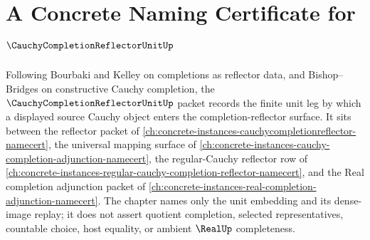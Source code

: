 \chapter{A Concrete Naming Certificate for $\CauchyCompletionReflectorUnitUp$}
\label{ch:concrete-instances-cauchy-completion-reflector-unit-namecert}

Following Bourbaki and Kelley on completions as reflector data, and Bishop--Bridges on constructive Cauchy completion, the $\CauchyCompletionReflectorUnitUp$ packet records the finite unit leg by which a displayed source Cauchy object enters the completion-reflector surface. It sits between the reflector packet of \autoref{ch:concrete-instances-cauchycompletionreflector-namecert}, the universal mapping surface of \autoref{ch:concrete-instances-cauchy-completion-adjunction-namecert}, the regular-Cauchy reflector row of \autoref{ch:concrete-instances-regular-cauchy-completion-reflector-namecert}, and the Real completion adjunction packet of \autoref{ch:concrete-instances-real-completion-adjunction-namecert}. The chapter names only the unit embedding and its dense-image replay; it does not assert quotient completion, selected representatives, countable choice, host equality, or ambient $\RealUp$ completeness.

